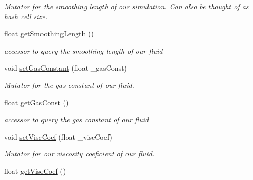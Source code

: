 \begin{DoxyCompactItemize}
\begin{DoxyCompactList}\small\item\em Mutator for the smoothing length of our simulation. Can also be thought of as hash cell size. \end{DoxyCompactList}\item 
\hypertarget{class_s_p_h_engine_a5eebbb4eaf3c773e263396d49a76fc3e}{float \hyperlink{class_s_p_h_engine_a5eebbb4eaf3c773e263396d49a76fc3e}{get\-Smoothing\-Length} ()}\label{class_s_p_h_engine_a5eebbb4eaf3c773e263396d49a76fc3e}

\begin{DoxyCompactList}\small\item\em accessor to query the smoothing length of our fluid \end{DoxyCompactList}\item 
\hypertarget{class_s_p_h_engine_a293fc06859e21473b03626a55c5c3a69}{void \hyperlink{class_s_p_h_engine_a293fc06859e21473b03626a55c5c3a69}{set\-Gas\-Constant} (float \-\_\-gas\-Const)}\label{class_s_p_h_engine_a293fc06859e21473b03626a55c5c3a69}

\begin{DoxyCompactList}\small\item\em Mutator for the gas constant of our fluid. \end{DoxyCompactList}\item 
\hypertarget{class_s_p_h_engine_a683d29b540672f364c306b304bd50ea7}{float \hyperlink{class_s_p_h_engine_a683d29b540672f364c306b304bd50ea7}{get\-Gas\-Const} ()}\label{class_s_p_h_engine_a683d29b540672f364c306b304bd50ea7}

\begin{DoxyCompactList}\small\item\em accessor to query the gas constant of our fluid \end{DoxyCompactList}\item 
\hypertarget{class_s_p_h_engine_a296c06a01cb0a93dfa150c3acea64493}{void \hyperlink{class_s_p_h_engine_a296c06a01cb0a93dfa150c3acea64493}{set\-Visc\-Coef} (float \-\_\-visc\-Coef)}\label{class_s_p_h_engine_a296c06a01cb0a93dfa150c3acea64493}

\begin{DoxyCompactList}\small\item\em Mutator for our viscosity coeficient of our fluid. \end{DoxyCompactList}\item 
\hypertarget{class_s_p_h_engine_a6d3709693af1379db5b60b02171d8c8b}{float \hyperlink{class_s_p_h_engine_a6d3709693af1379db5b60b02171d8c8b}{get\-Visc\-Coef} ()}\label{class_s_p_h_engine_a6d3709693af1379db5b60b02171d8c8b}


\end{DoxyCompactItemize}
